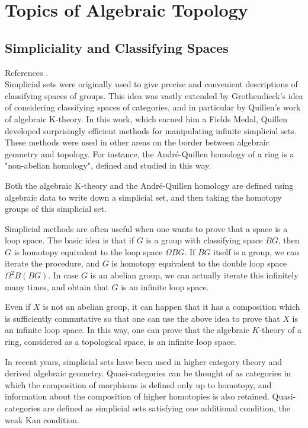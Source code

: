 \part{Topics of Algebraic Topology}

\chapter{Simpliciality and Classifying Spaces}
References \cite{richterCategoriesHomotopyTheory2020,goerssSimplicialHomotopyTheory2009,hatcherAlgebraicTopology2021}. \\

Simplicial sets were originally used to give precise and convenient descriptions of classifying spaces of groups. This idea was vastly extended by Grothendieck's idea of considering classifying spaces of categories, and in particular by Quillen's work of algebraic K-theory. In this work, which earned him a Fields Medal, Quillen developed surprisingly efficient methods for manipulating infinite simplicial sets. These methods were used in other areas on the border between algebraic geometry and topology. For instance, the André-Quillen homology of a ring is a "non-abelian homology", defined and studied in this way.

Both the algebraic K-theory and the André-Quillen homology are defined using algebraic data to write down a simplicial set, and then taking the homotopy groups of this simplicial set.

Simplicial methods are often useful when one wants to prove that a space is a loop space. The basic idea is that if $G$ is a group with classifying space $B G$, then $G$ is homotopy equivalent to the loop space $\Omega B G$. If $B G$ itself is a group, we can iterate the procedure, and $G$ is homotopy equivalent to the double loop space $\Omega^2 B(B G)$. In case $G$ is an abelian group, we can actually iterate this infinitely many times, and obtain that $G$ is an infinite loop space.

Even if $X$ is not an abelian group, it can happen that it has a composition which is sufficiently commutative so that one can use the above idea to prove that $X$ is an infinite loop space. In this way, one can prove that the algebraic $K$-theory of a ring, considered as a topological space, is an infinite loop space.

In recent years, simplicial sets have been used in higher category theory and derived algebraic geometry. Quasi-categories can be thought of as categories in which the composition of morphisms is defined only up to homotopy, and information about the composition of higher homotopies is also retained. Quasi-categories are defined as simplicial sets satisfying one additional condition, the weak Kan condition.

